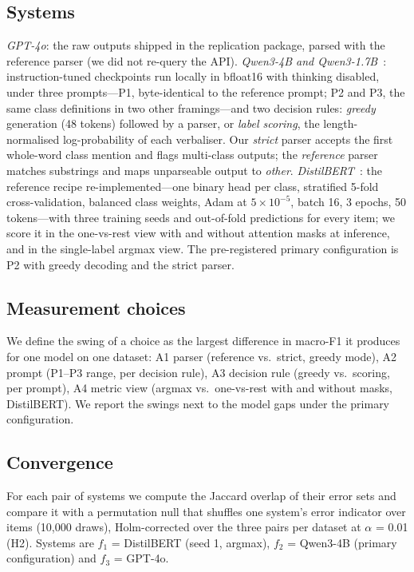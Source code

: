 \documentclass[sigconf,anonymous,review]{acmart}
\newcommand{\fone}{macro-F1\xspace}
\begin{document}
\subsection{Systems}
\emph{GPT-4o}: the raw outputs shipped in the replication package, parsed with the reference parser (we did not re-query the API). \emph{Qwen3-4B and Qwen3-1.7B}~\cite{qwen3}: instruction-tuned checkpoints run locally in bfloat16 with thinking disabled, under three prompts---P1, byte-identical to the reference prompt; P2 and P3, the same class definitions in two other framings---and two decision rules: \emph{greedy} generation (48 tokens) followed by a parser, or \emph{label scoring}, the length-normalised log-probability of each verbaliser. Our \emph{strict} parser accepts the first whole-word class mention and flags multi-class outputs; the \emph{reference} parser matches substrings and maps unparseable output to \emph{other}. \emph{DistilBERT}~\cite{sanh2019}: the reference recipe re-implemented---one binary head per class, stratified 5-fold cross-validation, balanced class weights, Adam at $5\times10^{-5}$, batch 16, 3 epochs, 50 tokens---with three training seeds and out-of-fold predictions for every item; we score it in the one-vs-rest view with and without attention masks at inference, and in the single-label argmax view. The pre-registered primary configuration is P2 with greedy decoding and the strict parser.

\subsection{Measurement choices}
We define the swing of a choice as the largest difference in \fone it produces for one model on one dataset: A1 parser (reference vs.\ strict, greedy mode), A2 prompt (P1--P3 range, per decision rule), A3 decision rule (greedy vs.\ scoring, per prompt), A4 metric view (argmax vs.\ one-vs-rest with and without masks, DistilBERT). We report the swings next to the model gaps under the primary configuration.

\subsection{Convergence}
For each pair of systems we compute the Jaccard overlap of their error sets and compare it with a permutation null that shuffles one system's error indicator over items (10{,}000 draws), Holm-corrected over the three pairs per dataset at $\alpha$ = 0.01 (H2). Systems are $f_1$ = DistilBERT (seed 1, argmax), $f_2$ = Qwen3-4B (primary configuration) and $f_3$ = GPT-4o.
\end{document}

